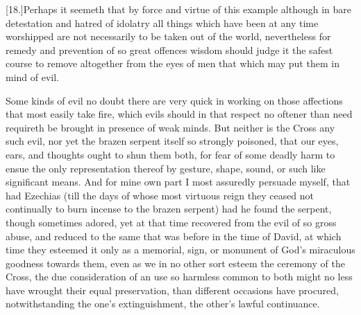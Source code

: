 [18.]Perhaps it seemeth that by force and virtue of this example although in bare detestation and hatred of idolatry all things which have been at any time worshipped are not necessarily to be taken out of the world, nevertheless for remedy and prevention of so great offences wisdom should judge it the safest course to remove altogether from the eyes of men that which may put them in mind of evil.

Some kinds of evil no doubt there are very quick in working on those affections that most easily take fire, which evils should in that respect no oftener than need requireth be brought in presence of weak minds. But neither is the Cross any such evil, nor yet the brazen serpent itself so strongly poisoned, that our eyes, ears, and thoughts ought to shun them both, for fear of some deadly harm to ensue the only representation thereof by gesture, shape, sound, or such like significant means. And for mine own part I most assuredly persuade myself, that had Ezechias (till the days of whose most virtuous reign they ceased not continually to burn incense to the brazen serpent) had he found the serpent, though sometimes adored, yet at that time recovered from the evil of so gross abuse, and reduced to the same that was before in the time of David, at which time they esteemed it only as a memorial, sign, or monument of God’s miraculous goodness towards them, even as we in no other sort esteem the ceremony of the Cross, the due consideration of an use so harmless common to both might no less have wrought their equal preservation, than different occasions have procured, notwithstanding the one’s extinguishment, the other’s lawful continuance.

